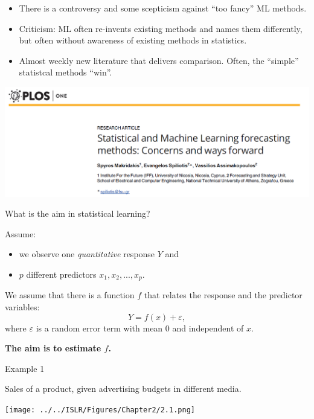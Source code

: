 \documentclass[ignorenonframetext,]{beamer}
\providecommand{\tightlist}{%
  \setlength{\itemsep}{0pt}\setlength{\parskip}{0pt}}
\begin{document}
\begin{frame}

\begin{itemize}
\item
  There is a controversy and some scepticism against ``too fancy'' ML
  methods.
\item
  Criticism: ML often re-invents existing methods and names them
  differently, but often without awareness of existing methods in
  statistics.
\item
  Almost weekly new literature that delivers comparison. Often, the
  ``simple'' statistcal methods ``win''.
\end{itemize}

\includegraphics{ML_vs_stat.png}

\end{frame}

\begin{frame}

\begin{block}{What is the aim in statistical learning?}

Assume:

\begin{itemize}
\tightlist
\item
  we observe one \emph{quantitative} response \(Y\) and
\item
  \(p\) different predictors \(x_1, x_2,... , x_p\).
\end{itemize}

We assume that there is a function \(f\) that relates the response and
the predictor variables: \[ Y = f(x) + \varepsilon,\] where
\(\varepsilon\) is a random error term with mean 0 and independent of
\(x\).

\centering
{\bf The aim is to estimate $f$.}

\end{block}

\end{frame}

\begin{frame}{Example 1}

Sales of a product, given advertising budgets in different media.

\texttt{[image: ../../ISLR/Figures/Chapter2/2.1.png]}

\end{frame}
\end{document}
